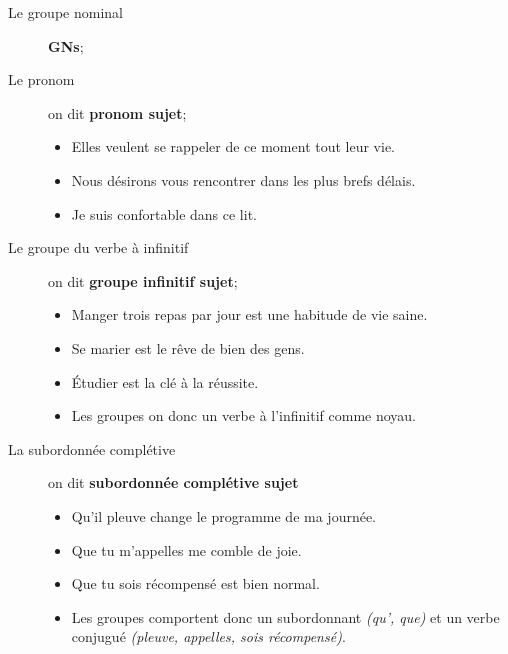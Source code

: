 \documentclass[10pt, french]{article}
\begin{document}
\begin{multicols*}{2}
\begin{distributions}
\begin{description}
	\item[Le groupe nominal]	\textbf{GNs};
	\item[Le pronom]	on dit \textbf{pronom sujet};
		\begin{itemize}[leftmargin = *]
		\item	\textcolor{blue_rectangle}{Elles} veulent se rappeler de ce moment tout leur vie.
		\item	\textcolor{blue_rectangle}{Nous} désirons vous rencontrer dans les plus brefs délais.
		\item	\textcolor{blue_rectangle}{Je} suis confortable dans ce lit.
		\end{itemize}
	\item[Le groupe du verbe à infinitif]	on dit \textbf{groupe infinitif sujet};
		\begin{itemize}[leftmargin = *]
		\item	\textcolor{blue_rectangle}{Manger trois repas par jour} est une habitude de vie saine.
		\item	\textcolor{blue_rectangle}{Se marier} est le rêve de bien des gens.
		\item	\textcolor{blue_rectangle}{Étudier} est la clé à la réussite.
		\item	Les groupes on donc un verbe à l'infinitif comme noyau.
		\end{itemize}
	\item[La subordonnée complétive]	on dit \textbf{subordonnée complétive sujet}
		\begin{itemize}[leftmargin = *]
		\item	\textcolor{blue_rectangle}{Qu'il pleuve} change le programme de ma journée.
		\item	\textcolor{blue_rectangle}{Que tu m'appelles} me comble de joie.
		\item	\textcolor{blue_rectangle}{Que tu sois récompensé} est bien normal.
		\item	Les groupes comportent donc un subordonnant \textit{(qu', que)} et un verbe conjugué \textit{(pleuve, appelles, sois récompensé)}.
		\end{itemize}
\end{description}
\end{distributions}


\end{multicols*}
\end{document}
